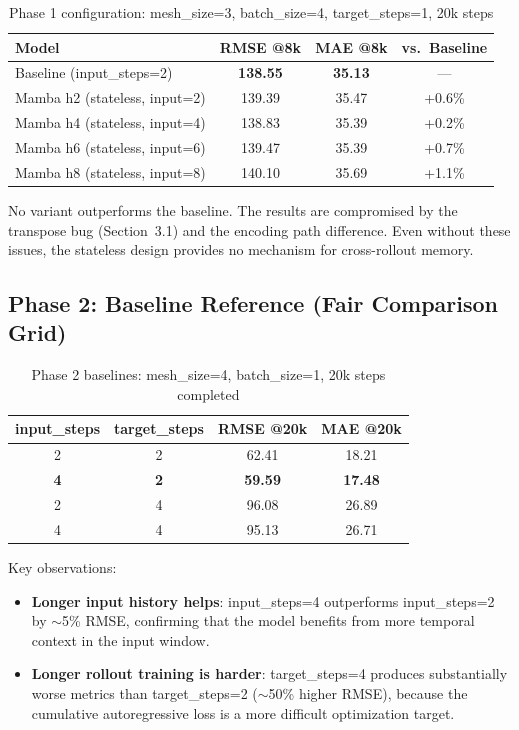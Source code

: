 \documentclass[11pt,a4paper]{article}
\begin{document}
\begin{table}[H]
\centering
\caption{Phase 1 configuration: mesh\_size=3, batch\_size=4, target\_steps=1, 20k steps}
\label{tab:phase1}
\begin{tabular}{lccc}
\toprule
Model & RMSE @8k & MAE @8k & vs.\ Baseline \\
\midrule
Baseline (input\_steps=2) & \textbf{138.55} & \textbf{35.13} & --- \\
Mamba h2 (stateless, input=2) & 139.39 & 35.47 & +0.6\% \\
Mamba h4 (stateless, input=4) & 138.83 & 35.39 & +0.2\% \\
Mamba h6 (stateless, input=6) & 139.47 & 35.39 & +0.7\% \\
Mamba h8 (stateless, input=8) & 140.10 & 35.69 & +1.1\% \\
\bottomrule
\end{tabular}
\end{table}

No variant outperforms the baseline. The results are compromised by the transpose bug (Section~3.1) and the encoding path difference. Even without these issues, the stateless design provides no mechanism for cross-rollout memory.

\subsection{Phase 2: Baseline Reference (Fair Comparison Grid)}

\begin{table}[H]
\centering
\caption{Phase 2 baselines: mesh\_size=4, batch\_size=1, 20k steps completed}
\label{tab:phase2_baseline}
\begin{tabular}{cccc}
\toprule
input\_steps & target\_steps & RMSE @20k & MAE @20k \\
\midrule
2 & 2 & 62.41 & 18.21 \\
\textbf{4} & \textbf{2} & \textbf{59.59} & \textbf{17.48} \\
2 & 4 & 96.08 & 26.89 \\
4 & 4 & 95.13 & 26.71 \\
\bottomrule
\end{tabular}
\end{table}

Key observations:
\begin{itemize}[nosep]
    \item \textbf{Longer input history helps}: input\_steps=4 outperforms input\_steps=2 by $\sim$5\% RMSE, confirming that the model benefits from more temporal context in the input window.
    \item \textbf{Longer rollout training is harder}: target\_steps=4 produces substantially worse metrics than target\_steps=2 ($\sim$50\% higher RMSE), because the cumulative autoregressive loss is a more difficult optimization target.
\end{itemize}
\end{document}
